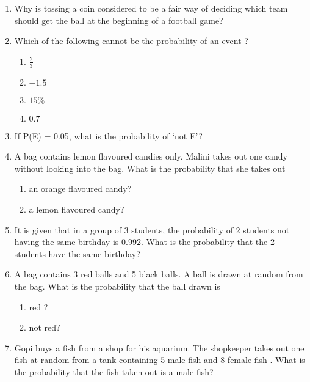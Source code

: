 \begin{enumerate}[label=\thesection.\arabic*,ref=\thesection.\theenumi]
	\item Why is tossing a coin considered to be a fair way of deciding which team should get the ball at the beginning of a football game?
		\\
\solution

	\item Which of the following cannot be the probability of an event ? 
\begin{enumerate}
\item $\frac{2}{3}$ 
\item $-1.5$ 
\item $15\%$ 
\item $0.7$ 
\end{enumerate}
\solution

\item If P(E) = 0.05, what is the probability of ‘not E’?\\
\solution

\item A bag contains lemon flavoured candies only. Malini takes out one candy without looking into the bag. What is the probability that she takes out
\begin{enumerate}
	\item an orange flavoured candy?
	\item a lemon flavoured candy?
\end{enumerate}
\solution

\item It is given that in a group of 3 students, the probability of 2 students not having the same birthday is 0.992. What is the probability that the 2 students have the same birthday?
	\\
\solution

\item A bag contains 3 red balls and 5 black balls. A ball is drawn at random from the bag.
What is the probability that the ball drawn is
\begin{enumerate}[label=(\roman*)] \item red ? \item not red? \end{enumerate}
\solution

\item Gopi buys a fish from a shop for his aquarium. The shopkeeper takes out one fish at random from a tank containing 5 male fish and 8 female fish . What is the probability that the fish taken out is a male fish?
	\\

\end{enumerate}
